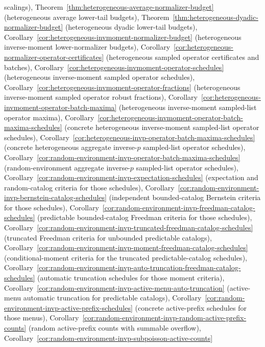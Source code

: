 \documentclass[11pt]{amsart}
\numberwithin{equation}{section}
\theoremstyle{definition}
\theoremstyle{remark}
\begin{document}
scalings),
Theorem~\ref{thm:heterogeneous-average-normalizer-budget} (heterogeneous
average lower-tail budgets),
Theorem~\ref{thm:heterogeneous-dyadic-normalizer-budget} (heterogeneous dyadic
lower-tail budgets),
Corollary~\ref{cor:heterogeneous-invmoment-normalizer-budget} (heterogeneous
inverse-moment lower-normalizer budgets),
Corollary~\ref{cor:heterogeneous-normalizer-operator-certificates}
(heterogeneous sampled operator certificates and batches),
Corollary~\ref{cor:heterogeneous-invmoment-operator-schedules}
(heterogeneous inverse-moment sampled operator schedules),
Corollary~\ref{cor:heterogeneous-invmoment-operator-fractions}
(heterogeneous inverse-moment sampled operator robust fractions),
Corollary~\ref{cor:heterogeneous-invmoment-operator-batch-maxima}
(heterogeneous inverse-moment sampled-list operator maxima),
Corollary~\ref{cor:heterogeneous-invmoment-operator-batch-maxima-schedules}
(concrete heterogeneous inverse-moment sampled-list operator schedules),
Corollary~\ref{cor:heterogeneous-invp-operator-batch-maxima-schedules}
(concrete heterogeneous aggregate inverse-\(p\) sampled-list operator schedules),
Corollary~\ref{cor:random-environment-invp-operator-batch-maxima-schedules}
(random-environment aggregate inverse-\(p\) sampled-list operator schedules),
Corollary~\ref{cor:random-environment-invp-expectation-schedules}
(expectation and random-catalog criteria for those schedules),
Corollary~\ref{cor:random-environment-invp-bernstein-catalog-schedules}
(independent bounded-catalog Bernstein criteria for those schedules),
Corollary~\ref{cor:random-environment-invp-freedman-catalog-schedules}
(predictable bounded-catalog Freedman criteria for those schedules),
Corollary~\ref{cor:random-environment-invp-truncated-freedman-catalog-schedules}
(truncated Freedman criteria for unbounded predictable catalogs),
Corollary~\ref{cor:random-environment-invp-moment-freedman-catalog-schedules}
(conditional-moment criteria for the truncated predictable-catalog schedules),
Corollary~\ref{cor:random-environment-invp-auto-truncation-freedman-catalog-schedules}
(automatic truncation schedules for those moment criteria),
Corollary~\ref{cor:random-environment-invp-active-menu-auto-truncation}
(active-menu automatic truncation for predictable catalogs),
Corollary~\ref{cor:random-environment-invp-active-prefix-schedules}
(concrete active-prefix schedules for those menus),
Corollary~\ref{cor:random-environment-invp-random-active-prefix-counts}
(random active-prefix counts with summable overflow),
Corollary~\ref{cor:random-environment-invp-subpoisson-active-counts}
\end{document}

